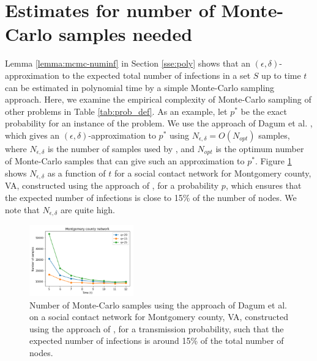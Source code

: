 
\section{Estimates for number of Monte-Carlo samples needed}
\label{sec:experiments}

Lemma \ref{lemma:mcmc-numinf} in Section \ref{sse:poly} shows that an 
$(\epsilon, \delta)$-approximation to the expected total number of infections 
in a set $S$ up to time $t$ can be estimated in polynomial time by a simple
Monte-Carlo sampling approach. Here, we examine the empirical complexity
of Monte-Carlo sampling of other problems in Table \ref{tab:prob_def}.
As an example, let $p^*$ be the exact probability for an instance of the \tTotInfs{} problem.
We use the approach of Dagum et al. \cite{dagum:focs95}, which gives an
$(\epsilon, \delta)$-approximation to $p^*$ using 
$N_{\epsilon, \delta} = O(N_{opt})$ samples, where
$N_{\epsilon, \delta}$ is the number of samples used by \cite{dagum:focs95}, and
$N_{opt}$ is the optimum number of Monte-Carlo samples that can give such an approximation
to $p^*$.  Figure \ref{fig:dagum-mcmc} shows $N_{\epsilon, \delta}$ as a function
of $t$ for a social contact network for Montgomery county, VA, 
constructed using the approach of \cite{eubank:nature04, barrett:wsc09},
for a probability $p$, which ensures that the expected number of infections
is close to 15\% of the number of nodes.
We note that $N_{\epsilon, \delta}$ are quite high.

\begin{figure}
\centering
\includegraphics[width=0.4\textwidth]{montgomery.png}
\caption{Number of Monte-Carlo samples using the approach of Dagum et al. \cite{dagum:focs95}
on a social contact network for Montgomery county, VA, constructed using the approach of
\cite{eubank:nature04, barrett:wsc09},
for a transmission probability, such that the expected number of infections 
is around 15\% of the total number of nodes.
}
\label{fig:dagum-mcmc}
\end{figure}

